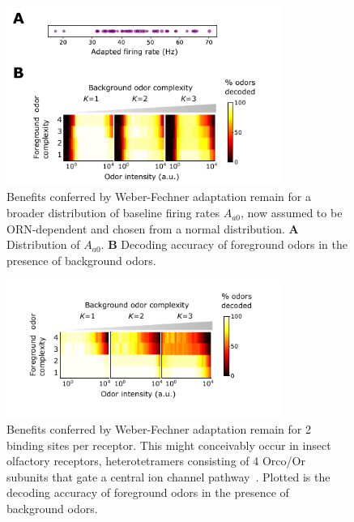 \documentclass[9pt,twoside]{pnas-new}
\begin{document}
\begin{figure}
\centering
\includegraphics[width=0.8\textwidth]{figures/broad_A0}
\caption{Benefits conferred by Weber-Fechner adaptation remain for a broader distribution of baseline firing rates $A_{a0}$, now assumed to be ORN-dependent and chosen from a normal distribution.
\textbf{A} Distribution of $A_{a0}$.
\textbf{B} Decoding accuracy of foreground odors in the presence of background odors.}
\label{fig:SI_broad_A0}
\end{figure}


\begin{figure}
\centering
\includegraphics[width=0.8\textwidth]{figures/2_binding_sites}
\caption{Benefits conferred by Weber-Fechner adaptation remain for 2 binding sites per receptor. This might conceivably occur in insect olfactory receptors, heterotetramers consisting of 4 Orco/Or subunits that gate a central ion channel pathway~\cite{orco_structure}. Plotted is the decoding accuracy of foreground odors in the presence of background odors.
}
\label{fig:SI_mult_binding}
\end{figure}
\end{document}
